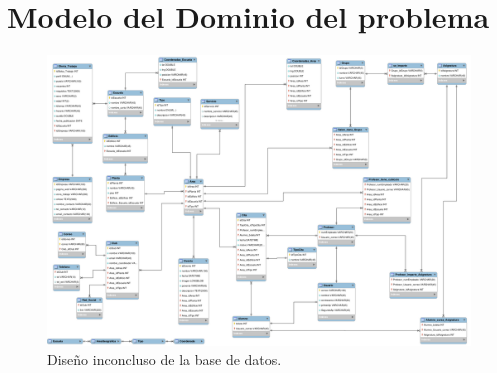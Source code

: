 \documentclass[oneside,10pt]{book}
\begin{document}

\chapter{Modelo del Dominio del problema}

	\begin{figure}[htbp!]
		\centering
			\includegraphics[width=1\textwidth]{images/baseDeDatos}
		\caption{Diseño inconcluso de la base de datos.}
	\end{figure}



\end{document}
